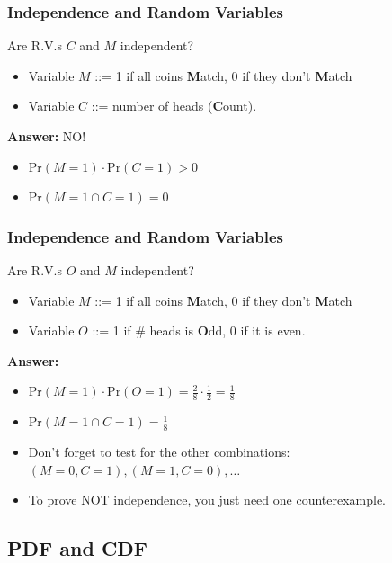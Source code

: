 \documentclass{beamer}
\begin{document}
\begin{frame}
  \frametitle{Independence and Random Variables}

  Are R.V.s $C$ and $M$ independent?
  \bigskip
  
  \begin{itemize}
  \item Variable $M$ ::= 1 if all coins {\bf M}atch, 0 if they don't {\bf M}atch
  \item Variable $C$ ::= number of heads ({\bf C}ount).    
  \end{itemize}

  \bigskip

  {\bf Answer:} \alert{NO!}
  \begin{itemize}
  \item Pr$(M=1)\cdot$Pr$(C=1) > 0$
  \item Pr$(M=1 \cap C=1) = 0$
  \end{itemize}  
\end{frame}

\begin{frame}
  \frametitle{Independence and Random Variables}

  Are R.V.s $O$ and $M$ independent?
  \bigskip
  
  \begin{itemize}
  \item Variable $M$ ::= 1 if all coins {\bf M}atch, 0 if they don't {\bf M}atch
  \item Variable $O$ ::= 1 if \# heads is {\bf O}dd, 0 if it is even.    
  \end{itemize}

  \bigskip

  {\bf Answer:} 
  \begin{itemize}
  \item Pr$(M=1)\cdot$Pr$(O=1) = \frac{2}{8}\cdot\frac{1}{2} = \frac{1}{8}$
  \item Pr$(M=1 \cap C=1) = \frac{1}{8}$
    \bigskip
    
  \item Don't forget to test for the other combinations: $(M = 0, C = 1), (M = 1, C = 0), \ldots$

    \bigskip

  \item To prove \alert{NOT} independence, you just need one counterexample.
  \end{itemize}  
\end{frame}

\subsection{PDF and CDF}
\end{document}
